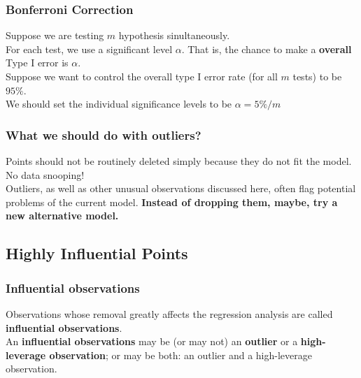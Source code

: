 \documentclass[11pt,a4paper]{article}
\begin{document}
\subsubsection{Bonferroni Correction}
Suppose we are testing $m$ hypothesis sinultaneously.\\
For each test, we use a signiﬁcant level $\alpha$. That is, the chance to make a \textbf{overall} Type I error is $\alpha$.\\
Suppose we want to control the overall type I error rate (for all $m$ tests) to be $95\%$.\\
We should set the individual signiﬁcance levels to be $\alpha = 5\%/m$
\subsubsection{What we should do with outliers?}
Points should not be routinely deleted simply because they do not ﬁt the model. No data snooping!\\
Outliers, as well as other unusual observations discussed here, often ﬂag potential problems of the current model. \textbf{Instead of dropping them, maybe, try a new alternative model.}

\subsection{Highly Inﬂuential Points}
\subsubsection{Inﬂuential observations}
Observations whose removal greatly aﬀects the regression analysis are called \textbf{inﬂuential observations}.\\
An \textbf{inﬂuential observations} may be (or may not) an \textbf{outlier} or a \textbf{high-leverage observation}; or may be both: an outlier and a high-leverage observation.
\end{document}
